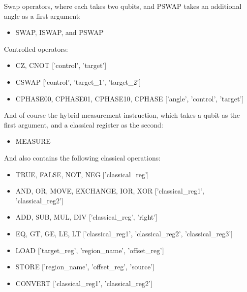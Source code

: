 \documentclass[journal]{IEEEtran}
\begin{document}
Swap operators, where each takes two qubits, and PSWAP takes an additional angle as a first argument:

\begin{itemize}
    \item SWAP, ISWAP, and PSWAP
\end{itemize}

Controlled operators:

\begin{itemize}
    \item CZ, CNOT ['control', 'target']
    \item CSWAP ['control', 'target\_1', 'target\_2']
    \item CPHASE00, CPHASE01, CPHASE10, CPHASE ['angle', 'control', 'target']
\end{itemize}

And of course the hybrid measurement instruction, which takes a qubit as the first argument, and a classical register as the second:

\begin{itemize}
    \item MEASURE
\end{itemize}

And also contains the following classical operations:

\begin{itemize}
    \item TRUE, FALSE, NOT, NEG ['classical\_reg']
    \item AND, OR, MOVE, EXCHANGE, IOR, XOR ['classical\_reg1', 'classical\_reg2']
    \item ADD, SUB, MUL, DIV ['classical\_reg', 'right']
    \item EQ, GT, GE, LE, LT ['classical\_reg1', 'classical\_reg2', 'classical\_reg3']
    \item LOAD ['target\_reg', 'region\_name', 'offset\_reg']
    \item STORE ['region\_name', 'offset\_reg', 'source']
    \item CONVERT ['classical\_reg1', 'classical\_reg2']
\end{itemize}
\end{document}
